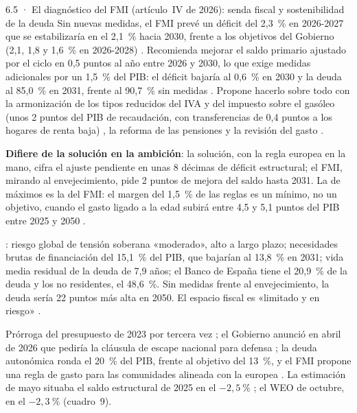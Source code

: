 \begin{complemento}{6.5 · El diagnóstico del FMI (artículo~IV de 2026): senda fiscal y sostenibilidad de la deuda}
 Sin nuevas medidas, el FMI prevé un déficit del 2,3~\% en 2026-2027 que se estabilizaría en el 2,1~\% hacia 2030, frente a los objetivos del Gobierno (2,1, 1,8 y 1,6~\% en 2026-2028) . Recomienda mejorar el saldo primario ajustado por el ciclo en 0,5 puntos al año entre 2026 y 2030, lo que exige medidas adicionales por un 1,5~\% del PIB: el déficit bajaría al 0,6~\% en 2030 y la deuda al 85,0~\% en 2031, frente al 90,7~\% sin medidas . Propone hacerlo sobre todo con la armonización de los tipos reducidos del IVA y del impuesto sobre el gasóleo (unos 2 puntos del PIB de recaudación, con transferencias de 0,4 puntos a los hogares de renta baja) , la reforma de las pensiones y la revisión del gasto .

\textbf{Difiere de la solución en la ambición}: la solución, con la regla europea en la mano, cifra el ajuste pendiente en unas 8 décimas de déficit estructural; el FMI, mirando al envejecimiento, pide 2 puntos de mejora del saldo hasta 2031. La de máximos es la del FMI: el margen del 1,5~\% de las reglas es un mínimo, no un objetivo, cuando el gasto ligado a la edad subirá entre 4,5 y 5,1 puntos del PIB entre 2025 y 2050 .

 : riesgo global de tensión soberana «moderado», alto a largo plazo; necesidades brutas de financiación del 15,1~\% del PIB, que bajarían al 13,8~\% en 2031; vida media residual de la deuda de 7,9 años; el Banco de España tiene el 20,9~\% de la deuda y los no residentes, el 48,6~\%. Sin medidas frente al envejecimiento, la deuda sería 22 puntos más alta en 2050. El espacio fiscal es «limitado y en riesgo» .

 Prórroga del presupuesto de 2023 por tercera vez ; el Gobierno anunció en abril de 2026 que pediría la cláusula de escape nacional para defensa ; la deuda autonómica ronda el 20~\% del PIB, frente al objetivo del 13~\%, y el FMI propone una regla de gasto para las comunidades alineada con la europea . La estimación de mayo situaba el saldo estructural de 2025 en el $-2{,}5~\%$ ; el WEO de octubre, en el $-2{,}3~\%$ (cuadro~9).
\end{complemento}
